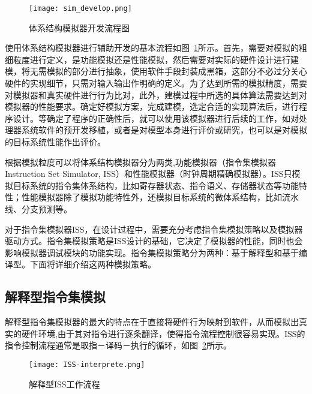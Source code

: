 \begin{figure}[h]
  \centering
  \texttt{[image: sim\_develop.png]}
  \caption{体系结构模拟器开发流程图}
  \label{fig:sim-dev-process}
\end{figure}

使用体系结构模拟器进行辅助开发的基本流程如图~\ref{fig:sim-dev-process}所示。首先，需要对模拟的粗细粒度进行定义，是功能模拟还是性能模拟，然后需要对实际的硬件设计进行建模，将无需模拟的部分进行抽象，使用软件手段封装成黑箱，这部分不必过分关心硬件的实现细节，只需对输入输出作明确的定义。为了达到所需的模拟精度，需要对模拟器和真实硬件进行行为比对，此外，建模过程中所选的具体算法需要达到对模拟器的性能要求。确定好模拟方案，完成建模，选定合适的实现算法后，进行程序设计。等确定了程序的正确性后，就可以使用该模拟器进行后续的工作，如对处理器系统软件的预开发移植，或者是对模型本身进行评价或研究，也可以是对模拟的目标系统性能作出评价。


根据模拟粒度可以将体系结构模拟器分为两类,功能模拟器（指令集模拟器Instruction  Set  Simulator, ISS）和性能模拟器（时钟周期精确模拟器）\cite{单磊2012大规模并行片上系统的分布式并行模拟关键技术研究}。ISS只模拟目标系统的指令集体系结构，比如寄存器状态、指令语义、存储器状态等功能特性；性能模拟器除了模拟功能特性外，还模拟目标系统的微体系结构，比如流水线、分支预测等\cite{cachecengcideng}。

对于指令集模拟器ISS，在设计过程中，需要充分考虑指令集模拟策略以及模拟器驱动方式。指令集模拟策略是ISS设计的基础，它决定了模拟器的性能，同时也会影响模拟器调试模块的功能实现。指令集模拟策略分为两种：基于解释型和基于编译型。下面将详细介绍这两种模拟策略。



\subsection{解释型指令集模拟}
解释型指令集模拟器的最大的特点在于直接将硬件行为映射到软件，从而模拟出真实的硬件环境,由于其对指令进行逐条翻译，使得指令流程控制很容易实现\cite{jump,蔡启先2010mips64}。ISS的指令控制流程通常是取指－译码－执行的循环，如图~\ref{fig:ISS-interprete}所示。
\begin{figure}[h]
  \centering
  \texttt{[image: ISS-interprete.png]}
  \caption{解释型ISS工作流程}
  \label{fig:ISS-interprete}
\end{figure}


